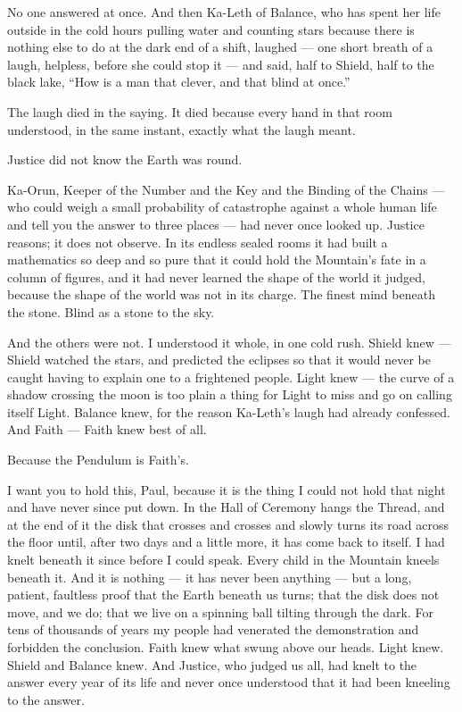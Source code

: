 No one answered at once. And then Ka-Leth of Balance, who has spent her life outside in the cold hours pulling water and counting stars because there is nothing else to do at the dark end of a shift, laughed — one short breath of a laugh, helpless, before she could stop it — and said, half to Shield, half to the black lake, ``How is a man that clever, and that blind at once.''\par
 
The laugh died in the saying. It died because every hand in that room understood, in the same instant, exactly what the laugh meant.\par
 
Justice did not know the Earth was round.\par
 
Ka-Orun, Keeper of the Number and the Key and the Binding of the Chains — who could weigh a small probability of catastrophe against a whole human life and tell you the answer to three places — had never once looked up. Justice reasons; it does not observe. In its endless sealed rooms it had built a mathematics so deep and so pure that it could hold the Mountain's fate in a column of figures, and it had never learned the shape of the world it judged, because the shape of the world was not in its charge. The finest mind beneath the stone. Blind as a stone to the sky.\par
 
And the others were not. I understood it whole, in one cold rush. Shield knew — Shield watched the stars, and predicted the eclipses so that it would never be caught having to explain one to a frightened people. Light knew — the curve of a shadow crossing the moon is too plain a thing for Light to miss and go on calling itself Light. Balance knew, for the reason Ka-Leth's laugh had already confessed. And Faith — Faith knew best of all.\par
 
Because the Pendulum is Faith's.\par
 
I want you to hold this, Paul, because it is the thing I could not hold that night and have never since put down. In the Hall of Ceremony hangs the Thread, and at the end of it the disk that crosses and crosses and slowly turns its road across the floor until, after two days and a little more, it has come back to itself. I had knelt beneath it since before I could speak. Every child in the Mountain kneels beneath it. And it is nothing — it has never been anything — but a long, patient, faultless proof that the Earth beneath us turns; that the disk does not move, and we do; that we live on a spinning ball tilting through the dark. For tens of thousands of years my people had venerated the demonstration and forbidden the conclusion. Faith knew what swung above our heads. Light knew. Shield and Balance knew. And Justice, who judged us all, had knelt to the answer every year of its life and never once understood that it had been kneeling to the answer.\par
 
